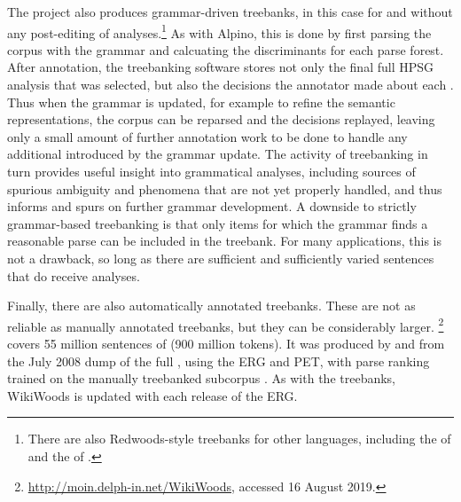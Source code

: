 \documentclass[output=paper
	        ,collection
	        ,collectionchapter
 	        ,biblatex
                ,babelshorthands
                ,newtxmath
                ,draftmode
                ,colorlinks, citecolor=brown
]{langscibook}
\begin{document}
The  project \citep{OFTM2004a-u} also produces grammar-driven
treebanks, in this case for  and without any post-editing of
analyses.\footnote{There are also Redwoods-style treebanks for other
  languages, including the  of 
  \citep{bond:etal:2004} and the  of 
  \citep{marimon:2015}.}  As with Alpino, this is done by first
parsing the corpus with the grammar and calcuating the discriminants
for each parse forest.  After annotation, the treebanking software stores not
only the final full HPSG analysis that was selected, but also the
decisions the annotator made about each .
Thus when the grammar is updated, for example to refine the semantic representations,
the corpus can be reparsed and the decisions replayed,
leaving only a small amount of further annotation work to be
done to handle any additional  introduced by the grammar update.
The activity of treebanking in turn provides useful insight into grammatical analyses,
including sources of spurious ambiguity and phenomena that are not yet
properly handled, and thus informs and spurs on further grammar
development.  A downside to strictly grammar-based treebanking is that
only items for which the grammar finds a reasonable parse can be
included in the treebank. For many applications, this is not a
drawback, so long as there are sufficient and sufficiently varied
sentences that do receive analyses.

Finally, there are also automatically annotated treebanks.
These are not as reliable as manually annotated treebanks,
but they can be considerably larger.
\footnote{\url{http://moin.delph-in.net/WikiWoods}, accessed 16 August 2019.}
covers 55 million sentences of  (900 million tokens).
It was produced by \citet{flickinger2010wikiwoods} and \citet{solberg2012wikiwoods}
from the July 2008 dump of the full  ,
using the ERG and PET,
with parse ranking trained on the manually treebanked subcorpus  \citep{ytrestol2009wescience}.
As with the  treebanks, WikiWoods is updated with each release of the ERG.%
%
%
%
%
%
\end{document}
